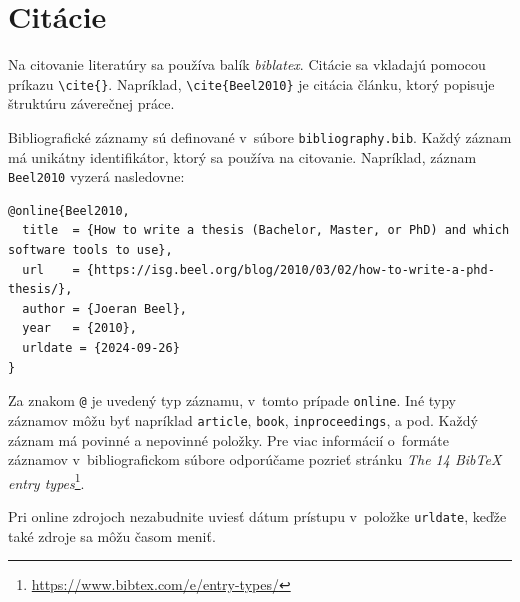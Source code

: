 \section{Citácie}

Na citovanie literatúry sa používa balík \emph{biblatex}. Citácie sa vkladajú pomocou príkazu \verb|\cite{}|. Napríklad, \verb|\cite{Beel2010}| je citácia článku, ktorý popisuje štruktúru záverečnej práce.

Bibliografické záznamy sú definované v~súbore \texttt{bibliography.bib}. Každý záznam má unikátny identifikátor, ktorý sa používa na citovanie. Napríklad, záznam \texttt{Beel2010} vyzerá nasledovne:


\begin{lstlisting}[breaklines=true, prebreak=\mbox{\textcolor{red}{$\hookleftarrow$}}]
@online{Beel2010,
  title  = {How to write a thesis (Bachelor, Master, or PhD) and which software tools to use},
  url    = {https://isg.beel.org/blog/2010/03/02/how-to-write-a-phd-thesis/},
  author = {Joeran Beel},
  year   = {2010},
  urldate = {2024-09-26}
}
\end{lstlisting}

Za znakom \texttt{@} je uvedený typ záznamu, v~tomto prípade \texttt{online}. Iné typy záznamov môžu byť napríklad \texttt{article}, \texttt{book}, \texttt{inproceedings}, a pod. Každý záznam má povinné a nepovinné položky. Pre viac informácií o~formáte záznamov v~bibliografickom súbore odporúčame pozrieť stránku \emph{The 14 BibTeX entry types}\footnote{\url{https://www.bibtex.com/e/entry-types/}}.

Pri online zdrojoch nezabudnite uviesť dátum prístupu v~položke \texttt{urldate}, keďže také zdroje sa môžu časom meniť.
